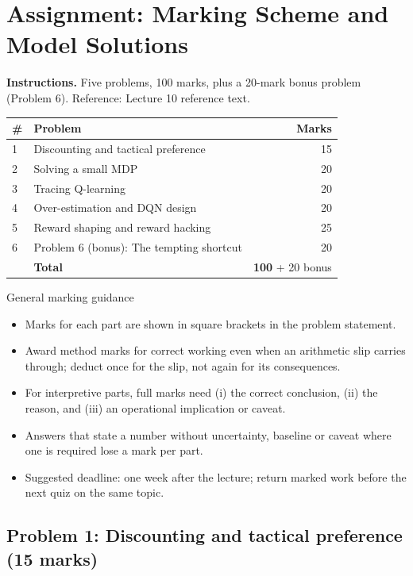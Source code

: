 \documentclass[11pt]{article}
\begin{document}
\section{Assignment: Marking Scheme and Model Solutions}

\textbf{Instructions.} Five problems, 100 marks, plus a 20-mark bonus problem (Problem 6). Reference: Lecture 10 reference text.

\begin{center}\small\renewcommand{\arraystretch}{1.25}\begin{tabularx}{0.85\textwidth}{@{}l X r@{}}\toprule\textbf{\#} & \textbf{Problem} & \textbf{Marks}\\\midrule1 & Discounting and tactical preference & 15\\
2 & Solving a small MDP & 20\\
3 & Tracing Q-learning & 20\\
4 & Over-estimation and DQN design & 20\\
5 & Reward shaping and reward hacking & 25\\
6 & Problem 6 (bonus): The tempting shortcut & 20\\\midrule & \textbf{Total} & \textbf{100} + 20 bonus\\\bottomrule\end{tabularx}\end{center}

\begin{instr}{General marking guidance}\begin{itemize}
\item Marks for each part are shown in square brackets in the problem statement.
\item Award method marks for correct working even when an arithmetic slip carries through; deduct once for the slip, not again for its consequences.
\item For interpretive parts, full marks need (i) the correct conclusion, (ii) the reason, and (iii) an operational implication or caveat.
\item Answers that state a number without uncertainty, baseline or caveat where one is required lose a mark per part.
\item Suggested deadline: one week after the lecture; return marked work before the next quiz on the same topic.
\end{itemize}\end{instr}

\subsection{Problem 1: Discounting and tactical preference \normalfont\small\color{GreyN}(15 marks)}
\end{document}
